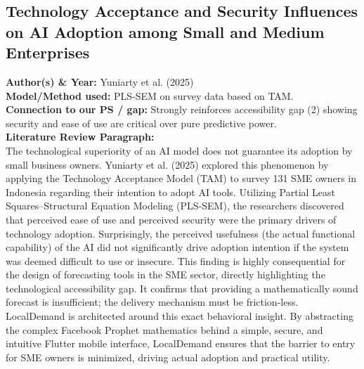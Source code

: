 \documentclass[conference]{IEEEtran}
\begin{document}
\subsection{Technology Acceptance and Security Influences on AI Adoption among Small and Medium Enterprises}
\textbf{Author(s) \& Year:} Yuniarty et al. (2025)\\
\textbf{Model/Method used:} PLS-SEM on survey data based on TAM.\\
\textbf{Connection to our PS / gap:} Strongly reinforces accessibility gap (2) showing security and ease of use are critical over pure predictive power.\\
\textbf{Literature Review Paragraph:}\\
The technological superiority of an AI model does not guarantee its adoption by small business owners. Yuniarty et al. (2025) explored this phenomenon by applying the Technology Acceptance Model (TAM) to survey 131 SME owners in Indonesia regarding their intention to adopt AI tools. Utilizing Partial Least Squares–Structural Equation Modeling (PLS-SEM), the researchers discovered that perceived ease of use and perceived security were the primary drivers of technology adoption. Surprisingly, the perceived usefulness (the actual functional capability) of the AI did not significantly drive adoption intention if the system was deemed difficult to use or insecure. This finding is highly consequential for the design of forecasting tools in the SME sector, directly highlighting the technological accessibility gap. It confirms that providing a mathematically sound forecast is insufficient; the delivery mechanism must be friction-less. LocalDemand is architected around this exact behavioral insight. By abstracting the complex Facebook Prophet mathematics behind a simple, secure, and intuitive Flutter mobile interface, LocalDemand ensures that the barrier to entry for SME owners is minimized, driving actual adoption and practical utility.
\end{document}
